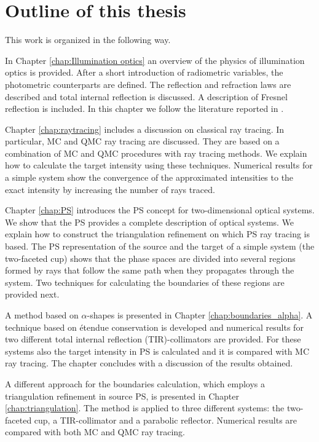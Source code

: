 \section{Outline of this thesis}
This work is organized in the following way.

In Chapter \ref{chap:Illumination optics} an overview of the physics of illumination optics is provided. After a short introduction of radiometric variables, the photometric counterparts are defined. The reflection and refraction laws are described and total internal reflection is discussed. A description of Fresnel reflection is included. In this chapter we follow the literature reported in \cite{hecht1998hecht, feynman2011feynman, feynman1964feynman}.

Chapter \ref{chap:raytracing} includes a discussion on classical ray tracing. In particular, MC and QMC ray tracing are discussed. They are based on a combination of MC and QMC procedures with ray tracing methods. We explain how to calculate the target intensity using these techniques. Numerical results for a simple system show the convergence of the approximated intensities to the exact intensity by increasing the number of rays traced.

Chapter \ref{chap:PS} introduces the PS concept for two-dimensional optical systems. We show that the PS provides a complete description of optical systems. We explain how to construct the triangulation refinement on which PS ray tracing is based. The PS representation of the source and the target of a simple system (the two-faceted cup) shows that the phase spaces are divided into several regions formed by rays that follow the same path when they propagates through the system. Two techniques for calculating the boundaries of these regions are provided next. 
 
A method based on $\alpha$-shapes is presented in Chapter \ref{chap:boundaries_alpha}. A technique based on \'{e}tendue conservation is developed and numerical results for two different total internal reflection (TIR)-collimators are provided. For these systems also the target intensity in PS is calculated and it is compared with MC ray tracing. The chapter concludes with a discussion of the results obtained.

A different approach for the boundaries calculation, which employs a triangulation refinement in source PS, is presented in Chapter \ref{chap:triangulation}. The method is applied to three different systems: the two-faceted cup, a TIR-collimator and a parabolic reflector. Numerical results are compared with both MC and QMC ray tracing.

